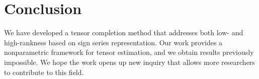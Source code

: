 \documentclass{article}
\theoremstyle{plain}
\theoremstyle{definition}
\begin{document}
\section{Conclusion}
We have developed a tensor completion method that addresses both low- and high-rankness based on sign series representation. Our work provides a nonparametric framework for tensor estimation, and we obtain results  previously impossible.  We hope the work opens up new inquiry that allows more researchers to contribute to this field.
%



\end{document}
